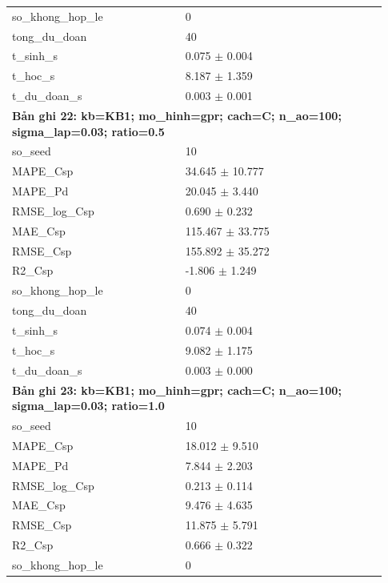 \begin{longtable}{p{0.43\linewidth}p{0.50\linewidth}}
so\_\allowbreak khong\_\allowbreak hop\_\allowbreak le & 0 \\
tong\_\allowbreak du\_\allowbreak doan & 40 \\
t\_\allowbreak sinh\_\allowbreak s & 0.075 $\pm$ 0.004 \\
t\_\allowbreak hoc\_\allowbreak s & 8.187 $\pm$ 1.359 \\
t\_\allowbreak du\_\allowbreak doan\_\allowbreak s & 0.003 $\pm$ 0.001 \\
\midrule
\multicolumn{2}{p{0.95\linewidth}}{\textbf{Bản ghi 22: kb=KB1; mo\_hinh=gpr; cach=C; n\_ao=100; sigma\_lap=0.03; ratio=0.5}} \\
so\_\allowbreak seed & 10 \\
MAPE\_\allowbreak Csp & 34.645 $\pm$ 10.777 \\
MAPE\_\allowbreak Pd & 20.045 $\pm$ 3.440 \\
RMSE\_\allowbreak log\_\allowbreak Csp & 0.690 $\pm$ 0.232 \\
MAE\_\allowbreak Csp & 115.467 $\pm$ 33.775 \\
RMSE\_\allowbreak Csp & 155.892 $\pm$ 35.272 \\
R2\_\allowbreak Csp & -1.806 $\pm$ 1.249 \\
so\_\allowbreak khong\_\allowbreak hop\_\allowbreak le & 0 \\
tong\_\allowbreak du\_\allowbreak doan & 40 \\
t\_\allowbreak sinh\_\allowbreak s & 0.074 $\pm$ 0.004 \\
t\_\allowbreak hoc\_\allowbreak s & 9.082 $\pm$ 1.175 \\
t\_\allowbreak du\_\allowbreak doan\_\allowbreak s & 0.003 $\pm$ 0.000 \\
\midrule
\multicolumn{2}{p{0.95\linewidth}}{\textbf{Bản ghi 23: kb=KB1; mo\_hinh=gpr; cach=C; n\_ao=100; sigma\_lap=0.03; ratio=1.0}} \\
so\_\allowbreak seed & 10 \\
MAPE\_\allowbreak Csp & 18.012 $\pm$ 9.510 \\
MAPE\_\allowbreak Pd & 7.844 $\pm$ 2.203 \\
RMSE\_\allowbreak log\_\allowbreak Csp & 0.213 $\pm$ 0.114 \\
MAE\_\allowbreak Csp & 9.476 $\pm$ 4.635 \\
RMSE\_\allowbreak Csp & 11.875 $\pm$ 5.791 \\
R2\_\allowbreak Csp & 0.666 $\pm$ 0.322 \\
so\_\allowbreak khong\_\allowbreak hop\_\allowbreak le & 0 \\

\end{longtable}
